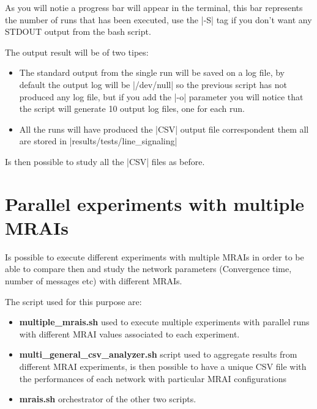 \documentclass[10pt,journal,onecolumn]{IEEEtran}
\begin{document}
As you will notie a progress bar will appear in the terminal, this bar represents
the number of runs that has been executed, use the |-S| tag if you don't want
any STDOUT output from the bash script.

The output result will be of two tipes:
\begin{itemize}
		\item The standard output from the single run will be saved on a log
			file, by default the output log will be |/dev/null| so the previous
			script has not produced any log file, but if you add the 
			|-o| parameter you will notice that the script will generate \num{10} output
			log files, one for each run.
		\item All the runs will have produced the |CSV| output file correspondent
			them all are stored in |results/tests/line_signaling|
\end{itemize}

Is then possible to study all the |CSV| files as before.

\section{Parallel experiments with multiple MRAIs}
\label{sec:parallel_mrais}

Is possible to execute different experiments with multiple \ac{MRAI}s in order
to be able to compare then and study the network parameters (Convergence time, number
of messages etc) with different \ac{MRAIs}.

The script used for this purpose are:
\begin{itemize}
	\item \textbf{multiple_mrais.sh} used to execute multiple experiments with
		parallel runs with different \ac{MRAI} values associated to each
		experiment.
	\item \textbf{multi_general_csv_analyzer.sh} script used to aggregate 
		results from different \ac{MRAI} experiments, is then possible to 
		have a unique CSV file with the performances of each network with
		particular \ac{MRAI} configurations
	\item \textbf{mrais.sh} orchestrator of the other two scripts.
\end{itemize}
\end{document}
